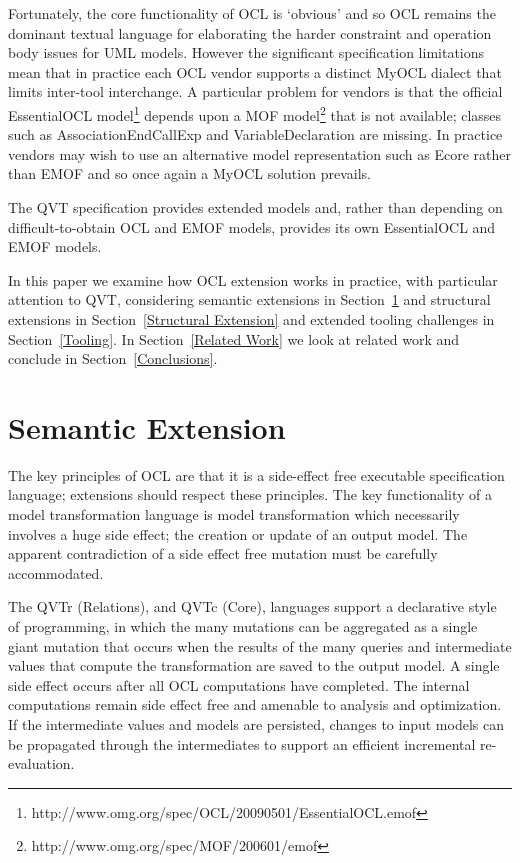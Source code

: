 \documentclass{llncs}
\begin{document}
Fortunately, the core functionality of OCL is `obvious' and so OCL remains the dominant textual language for elaborating the harder constraint and operation body issues for UML models. However the significant specification limitations mean that in practice each OCL vendor supports a distinct MyOCL dialect that limits inter-tool interchange. A particular problem for vendors is that the official EssentialOCL model\footnote{http://www.omg.org/spec/OCL/20090501/EssentialOCL.emof} depends upon a MOF model\footnote{http://www.omg.org/spec/MOF/200601/emof} that is not available; classes such as AssociationEndCallExp and VariableDeclaration are missing. In practice vendors may wish to use an alternative model representation such as Ecore rather than EMOF and so once again a MyOCL solution prevails.

The QVT specification provides extended models and, rather than depending on difficult-to-obtain OCL and EMOF models, provides its own EssentialOCL and EMOF models.

In this paper we examine how OCL extension works in practice, with particular attention to QVT, considering semantic extensions in Section~\ref{Semantic Extension} and structural extensions in Section~\ref{Structural Extension} and extended tooling challenges in Section~\ref{Tooling}. In Section~\ref{Related Work} we look at related work and conclude in Section~\ref{Conclusions}.

\section{Semantic Extension}\label{Semantic Extension}

The key principles of OCL are that it is a side-effect free executable specification language; extensions should respect these principles. The key functionality of a model transformation language is model transformation which necessarily involves a huge side effect; the creation or update of an output model. The apparent contradiction of a side effect free mutation must be carefully accommodated.

The QVTr (Relations), and QVTc (Core),  languages support a declarative style of programming, in which the many mutations can be aggregated as a single giant mutation that occurs when the results of the many queries and intermediate values that compute the transformation are saved to the output model. A single side effect occurs after all OCL computations have completed. The internal computations remain side effect free and amenable to analysis and optimization. If the intermediate values and models are persisted, changes to input models can be propagated through the intermediates to support an efficient incremental re-evaluation.
\end{document}
